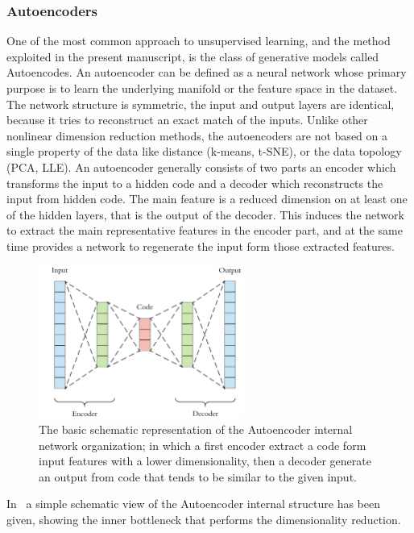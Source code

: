 \subsubsection{Autoencoders}

One of the most common approach to unsupervised learning, and the method exploited in the present manuscript, is the class of generative models called Autoencodes.
An autoencoder can be defined as a neural network whose primary purpose is to learn the underlying manifold or the feature space in the dataset. The network structure is symmetric, the input and output layers are identical, because it tries to reconstruct an exact match of the inputs. Unlike other nonlinear dimension reduction methods, the autoencoders are not based on a single property of the data like distance (k-means, t-SNE), or the data topology (PCA, LLE). An autoencoder generally consists of two parts an encoder which transforms the input to a hidden code and a decoder which reconstructs the input from hidden code. The main feature is a reduced dimension on at least one of the hidden layers, that is the output of the decoder. This induces the network to extract the main representative features in the encoder part, and at the same time provides a network to regenerate the input form those extracted features.
\begin{figure}[h]
    \centering
    \includegraphics[height=5cm]{img/3_ML/Autoencoder.png}
    \caption{The basic schematic representation of the Autoencoder internal network organization; in which a first encoder extract a code form input features with a lower dimensionality, then a decoder generate an output from code that tends to be similar to the given input. }
    \label{fig:autoencoder}
\end{figure}
In~\Figure{\ref{fig:autoencoder}} a simple schematic view of the Autoencoder internal structure has been given, showing the inner bottleneck that performs the dimensionality reduction.


